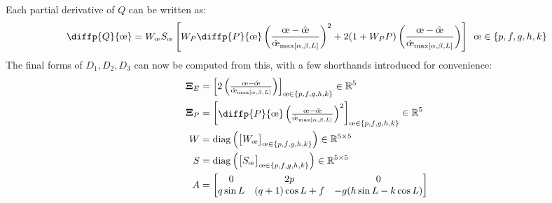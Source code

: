 Each partial derivative of \(Q\) can be written as:
\begin{equation*}
    \diffp{Q}{{\moe}} = W_{\moe} S_{\moe} \left[ W_P\diffp{P}{{\moe}}\left(\frac{\moe - \hat{\moe}}{\dot{\moe}_{\maxrocall}} \right)^2 + 2 (1+W_P P) \left(\frac{\moe - \hat{\moe}}{\dot{\moe}_{\maxrocall}} \right) \right] \ \, \moe \in \{p, f, g, h, k\}
\end{equation*}
The final forms of \(D_1, D_2, D_3\) can now be computed from this, with a few shorthands introduced for convenience:
\begin{align*}
    \boldsymbol{\Xi}_E & = \begin{bmatrix}
                               2  \left(\frac{\moe - \hat{\moe}}{\dot{\moe}_{\maxrocall}} \right)
                           \end{bmatrix}_{\moe \in \{p, f, g, h, k\}} \in \mathbb{R}^5                                                 \\
    \boldsymbol{\Xi}_P & = \begin{bmatrix}
                               \diffp{P}{{\moe}}\left(\frac{\moe - \hat{\moe}}{\dot{\moe}_{\maxrocall}} \right)^2
                           \end{bmatrix}_{\moe \in \{p, f, g, h, k\}} \in \mathbb{R}^5 \\
    W                  & = \mathrm{diag} \left(\begin{bmatrix}
                                                   W_{\moe}
                                               \end{bmatrix}_{\moe \in \{p, f, g, h, k\}} \right) \in \mathbb{R}^{5 \times 5}                                                                                              \\
    S                  & = \mathrm{diag} \left(\begin{bmatrix}
                                                   S_{\moe}
                                               \end{bmatrix}_{\moe \in \{p, f, g, h, k\}}\right)  \in \mathbb{R}^{5 \times 5}                                                                                              \\
    A                  & =
    \begin{bmatrix}
        0        & 2p               & 0                                 \\
        q\sin L  & (q+1) \cos L + f & -g(h \sin L - k \cos L)           \\

\end{bmatrix}
\end{align*}
